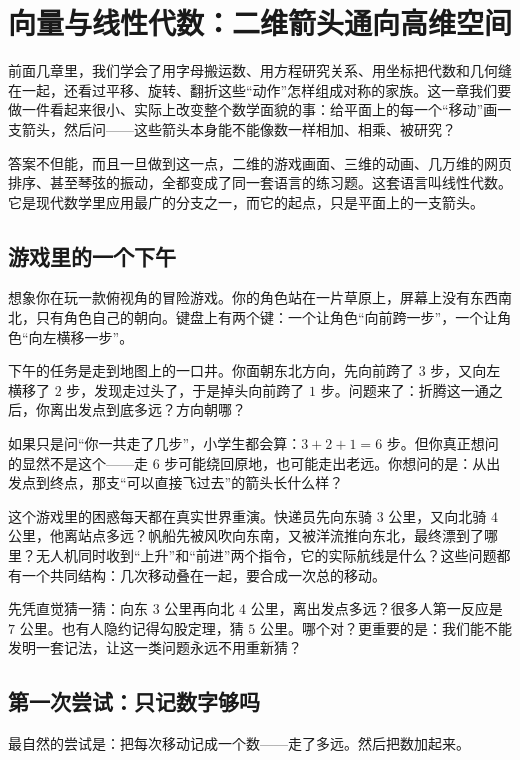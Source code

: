 \chapter{向量与线性代数：二维箭头通向高维空间}

前面几章里，我们学会了用字母搬运数、用方程研究关系、用坐标把代数和几何缝在一起，还看过平移、旋转、翻折这些“动作”怎样组成对称的家族。这一章我们要做一件看起来很小、实际上改变整个数学面貌的事：给平面上的每一个“移动”画一支箭头，然后问——这些箭头本身能不能像数一样相加、相乘、被研究？

答案不但能，而且一旦做到这一点，二维的游戏画面、三维的动画、几万维的网页排序、甚至琴弦的振动，全都变成了同一套语言的练习题。这套语言叫线性代数。它是现代数学里应用最广的分支之一，而它的起点，只是平面上的一支箭头。

\section{游戏里的一个下午}

想象你在玩一款俯视角的冒险游戏。你的角色站在一片草原上，屏幕上没有东西南北，只有角色自己的朝向。键盘上有两个键：一个让角色“向前跨一步”，一个让角色“向左横移一步”。

下午的任务是走到地图上的一口井。你面朝东北方向，先向前跨了 $3$ 步，又向左横移了 $2$ 步，发现走过头了，于是掉头向前跨了 $1$ 步。问题来了：折腾这一通之后，你离出发点到底多远？方向朝哪？

如果只是问“你一共走了几步”，小学生都会算：$3+2+1=6$ 步。但你真正想问的显然不是这个——走 $6$ 步可能绕回原地，也可能走出老远。你想问的是：从出发点到终点，那支“可以直接飞过去”的箭头长什么样？

这个游戏里的困惑每天都在真实世界重演。快递员先向东骑 $3$ 公里，又向北骑 $4$ 公里，他离站点多远？帆船先被风吹向东南，又被洋流推向东北，最终漂到了哪里？无人机同时收到“上升”和“前进”两个指令，它的实际航线是什么？这些问题都有一个共同结构：几次移动叠在一起，要合成一次总的移动。

先凭直觉猜一猜：向东 $3$ 公里再向北 $4$ 公里，离出发点多远？很多人第一反应是 $7$ 公里。也有人隐约记得勾股定理，猜 $5$ 公里。哪个对？更重要的是：我们能不能发明一套记法，让这一类问题永远不用重新猜？

\section{第一次尝试：只记数字够吗}

最自然的尝试是：把每次移动记成一个数——走了多远。然后把数加起来。

